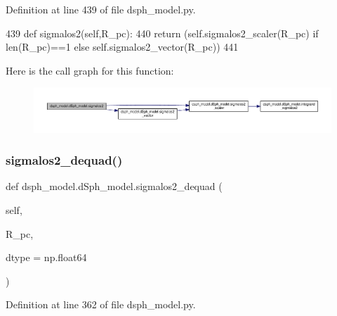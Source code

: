 Definition at line 439 of file dsph\+\_\+model.\+py.


\begin{DoxyCode}
439     \textcolor{keyword}{def }sigmalos2(self,R\_pc):
440         \textcolor{keywordflow}{return} (self.sigmalos2\_scaler(R\_pc) \textcolor{keywordflow}{if} len(R\_pc)==1 \textcolor{keywordflow}{else} self.sigmalos2\_vector(R\_pc))
441     
\end{DoxyCode}
Here is the call graph for this function\+:
\nopagebreak
\begin{figure}[H]
\begin{center}
\leavevmode
\includegraphics[width=350pt]{d0/d25/classdsph__model_1_1dSph__model_a7b94850b439fe4afc431cfffa185d415_cgraph}
\end{center}
\end{figure}
\mbox{\label{classdsph__model_1_1dSph__model_a87273cf6ad641b1d12f9b236821807c6}} 
\subsubsection{\texorpdfstring{sigmalos2\+\_\+dequad()}{sigmalos2\_dequad()}}
{\footnotesize\ttfamily def dsph\+\_\+model.\+d\+Sph\+\_\+model.\+sigmalos2\+\_\+dequad (\begin{DoxyParamCaption}\item[{}]{self,  }\item[{}]{R\+\_\+pc,  }\item[{}]{dtype = {\ttfamily np.float64} }\end{DoxyParamCaption})}



Definition at line 362 of file dsph\+\_\+model.\+py.


